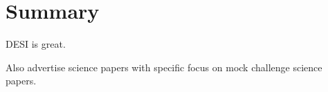 \section{Summary}
DESI is great. 

Also advertise science papers with specific focus on mock
challenge science papers.
